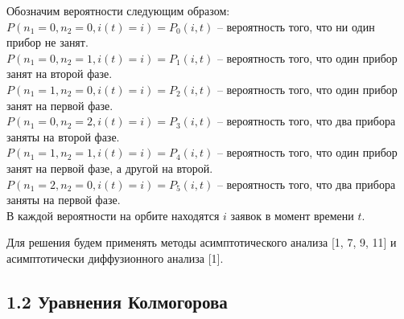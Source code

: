 Обозначим вероятности следующим образом:\\
$P(n_{1}=0,n_{2}=0,i(t)=i)=P_{0}(i, t)$ -- вероятность того, что ни один прибор не занят.\\
$P(n_{1}=0,n_{2}=1,i(t)=i)=P_{1}(i, t)$ -- вероятность того, что один прибор занят на второй фазе.\\
$P(n_{1}=1,n_{2}=0,i(t)=i)=P_{2}(i, t)$ -- вероятность того, что один прибор занят на первой фазе.\\
$P(n_{1}=0,n_{2}=2,i(t)=i)=P_{3}(i, t)$ -- вероятность того, что два прибора заняты на второй фазе.\\
$P(n_{1}=1,n_{2}=1,i(t)=i)=P_{4}(i, t)$ -- вероятность того, что один прибор занят на первой фазе, а другой на второй.\\
$P(n_{1}=2,n_{2}=0,i(t)=i)=P_{5}(i, t)$ -- вероятность того, что два прибора заняты на первой фазе.\\
В каждой вероятности на орбите находятся $i$ заявок в момент времени $t$.

Для решения будем применять методы асимптотического анализа [1, 7, 9, 11] и асимптотически диффузионного анализа [1].

\newpage

\subsection{1.2 Уравнения Колмогорова}


